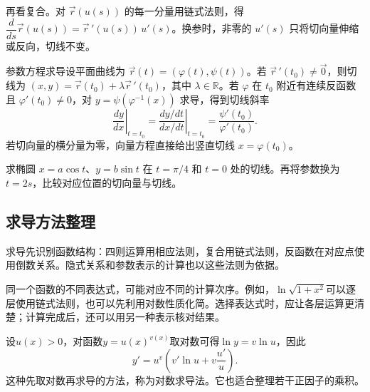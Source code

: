 再看复合。对 \(\vec r(u(s))\) 的每一分量用链式法则，得 \(\dfrac{d}{ds}\vec r(u(s))=\vec r\,'(u(s))\,u'(s)\)。换参时，非零的 \(u'(s)\) 只将切向量伸缩或反向，切线不变。

{\heiti 参数方程求导}\quad 设平面曲线为 \(\vec r(t)=(\varphi(t),\psi(t))\)。若 \(\vec r\,'(t_0)\ne\vec 0\)，则切线为 \((x,y)=\vec r(t_0)+\lambda\vec r\,'(t_0)\)，其中 \(\lambda\in\mathbb R\)。若 \(\varphi\) 在 \(t_0\) 附近有连续反函数且 \(\varphi'(t_0)\ne0\)，对 \(y=\psi(\varphi^{-1}(x))\) 求导，得到切线斜率
\[
 \left.\frac{dy}{dx}\right|_{t=t_0}
 =\left.\frac{dy/dt}{dx/dt}\right|_{t=t_0}
 =\frac{\psi'(t_0)}{\varphi'(t_0)}.
\]
若切向量的横分量为零，向量方程直接给出竖直切线 \(x=\varphi(t_0)\)。

\begin{example}
求椭圆 \(x=a\cos t\)、\(y=b\sin t\) 在 \(t=\pi/4\) 和 \(t=0\) 处的切线。再将参数换为 \(t=2s\)，比较对应位置的切向量与切线。
\end{example}

\subsection{求导方法整理}

求导先识别函数结构：四则运算用相应法则，复合用链式法则，反函数在对应点使用倒数关系。隐式关系和参数表示的计算也以这些法则为依据。

同一个函数的不同表达式，可能对应不同的计算次序。例如，\(\ln\sqrt{1+x^2}\)可以逐层使用链式法则，也可以先利用对数性质化简。选择表达式时，应让各层运算更清楚；计算完成后，还可以用另一种表示核对结果。

设\(u(x)>0\)，对函数\(y=u(x)^{v(x)}\)取对数可得\(\ln y=v\ln u\)，因此
\begin{equation*}
 y'=u^v\left(v'\ln u+v\frac{u'}u\right).
\end{equation*}
这种先取对数再求导的方法，称为{\heiti{}对数求导法}。它也适合整理若干正因子的乘积。

